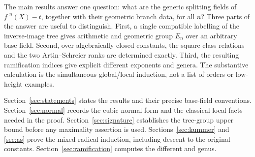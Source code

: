 The main results answer one question: what are the generic splitting
fields of $f^{\circ n}(X)-t$, together with their geometric branch data,
for all $n$? Three parts of the answer are useful to distinguish.
First, a single compatible labelling of the inverse-image tree gives
arithmetic and geometric group $E_n$ over an arbitrary base field.
Second, over algebraically closed constants, the square-class relations
and the two Artin--Schreier ranks are determined exactly. Third, the
resulting ramification indices give explicit different exponents and
genera. The substantive calculation is the simultaneous global/local
induction, not a list of orders or low-height examples.

Section~\ref{sec:statements} states the results and their precise base-field
conventions. Section~\ref{sec:normal} records the cubic normal form and
the classical local facts needed in the proof.
Section~\ref{sec:signature} establishes the tree-group upper bound
before any maximality assertion is used.
Sections~\ref{sec:kummer} and \ref{sec:as} prove the mixed-radical
induction, including descent to the original constants.
Section~\ref{sec:ramification} computes the different and genus.
